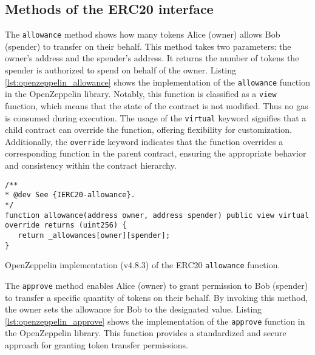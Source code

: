 
\subsection{Methods of the ERC20 interface}
\label{subsec:erc20_methods}


The \texttt{allowance} method shows how many tokens Alice (owner) allows Bob (spender) to transfer on their behalf. This method takes two parameters: the owner's address and the spender's address. It returns the number of tokens the spender is authorized to spend on behalf of the owner.
Listing \ref{lst:openzeppelin_allowance} shows the implementation of the \texttt{allowance} function in the OpenZeppelin library.
Notably, this function is classified as a \texttt{view} function, which means that the state of the contract is not modified. Thus no gas is consumed during execution.
The usage of the \texttt{virtual} keyword signifies that a child contract can override the function, offering flexibility for customization. Additionally, the \texttt{override} keyword indicates that the
function overrides a corresponding function in the parent contract, ensuring the appropriate behavior and consistency within the contract hierarchy.

\begin{listing}[!ht]
   \begin{verbatim}
/**
* @dev See {IERC20-allowance}.
*/
function allowance(address owner, address spender) public view virtual override returns (uint256) {
   return _allowances[owner][spender];
}
   \end{verbatim}
   \caption{OpenZeppelin implementation (v4.8.3) of the ERC20 \texttt{allowance} function.}
   \label{lst:openzeppelin_allowance}
\end{listing}



The \texttt{approve} method enables Alice (owner) to grant permission to Bob (spender) to transfer a specific quantity of tokens on their behalf. By invoking this method, the owner sets the allowance for Bob to the designated value.
Listing \ref{lst:openzeppelin_approve} shows the implementation of the \texttt{approve} function in the OpenZeppelin library. 
This function provides a standardized and secure approach for granting token transfer permissions.

